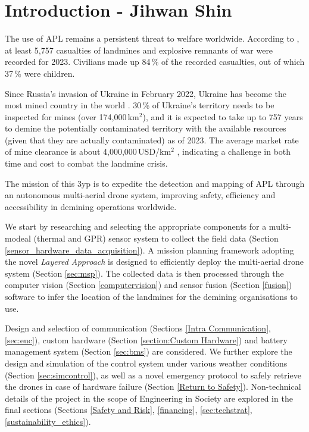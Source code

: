 \section{Introduction - Jihwan Shin} \label{introduction}

The use of \gls{APL} remains a persistent threat to welfare worldwide. According to \cite{icbl2024landmine}, at least 5,757 casualties of landmines and explosive remnants of war were recorded for 2023. Civilians made up 84\,\% of the recorded casualties, out of which 37\,\% were children. 

Since Russia's invasion of Ukraine in February 2022, Ukraine has become the most mined country in the world \cite{globsec2024ukraine}. 30\,\% of Ukraine's territory needs to be inspected for mines (over 174,000\,km$^2$), and it is expected to take up to 757 years to demine the potentially contaminated territory with the available resources (given that they are actually contaminated) as of 2023. The average market rate of mine clearance is about 4,000,000\,USD/km$^2$ \cite{globsec2023ukraine}, indicating a challenge in both time and cost to combat the landmine crisis. 

The mission of this \gls{3yp} is to expedite the detection and mapping of \gls{APL} through an autonomous multi-aerial drone system, improving safety, efficiency and accessibility in demining operations worldwide. 

We start by researching and selecting the appropriate components for a multi-modeal (thermal and \gls{GPR}) sensor system to collect the field data (Section \ref{sensor_hardware_data_acquisition}). A mission planning framework adopting the novel \textit{Layered Approach} is designed to efficiently deploy the multi-aerial drone system (Section \ref{sec:msp}). The collected data is then processed through the computer vision (Section \ref{computervision}) and sensor fusion (Section \ref{fusion}) software to infer the location of the landmines for the demining organisations to use. 

Design and selection of communication (Sections \ref{Intra Communication}, \ref{sec:euc}), custom hardware (Section \ref{section:Custom Hardware}) and battery management system (Section \ref{sec:bms}) are considered. We further explore the design and simulation of the control system under various weather conditions (Section \ref{sec:simcontrol}), as well as a novel emergency protocol to safely retrieve the drones in case of hardware failure (Section \ref{Return to Safety}). Non-technical details of the project in the scope of Engineering in Society are explored in the final sections (Sections \ref{Safety and Risk}, \ref{financing}, \ref{sec:techstrat}, \ref{sustainability_ethics}). 

